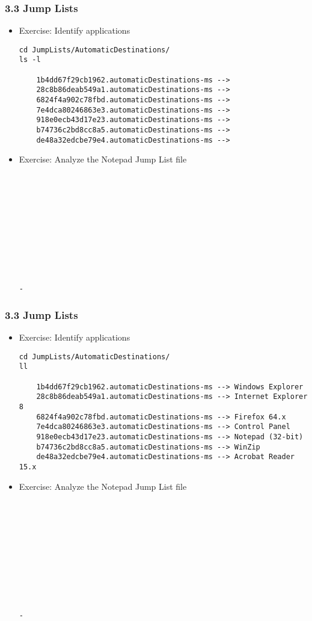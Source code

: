 \begin{frame}[fragile]
  \frametitle{3.3 Jump Lists}
    \begin{itemize}
        \item Exercise: Identify applications
  \begin{lstlisting}[basicstyle=\tiny]
cd JumpLists/AutomaticDestinations/
ls -l

    1b4dd67f29cb1962.automaticDestinations-ms --> 
    28c8b86deab549a1.automaticDestinations-ms --> 
    6824f4a902c78fbd.automaticDestinations-ms --> 
    7e4dca80246863e3.automaticDestinations-ms --> 
    918e0ecb43d17e23.automaticDestinations-ms --> 
    b74736c2bd8cc8a5.automaticDestinations-ms --> 
    de48a32edcbe79e4.automaticDestinations-ms --> 
  \end{lstlisting}
	\item Exercise: Analyze the Notepad Jump List file
  \begin{lstlisting}[basicstyle=\tiny]











-
  \end{lstlisting}
    \end{itemize}
\end{frame}


\begin{frame}[fragile]
  \frametitle{3.3 Jump Lists}
    \begin{itemize}
        \item Exercise: Identify applications
  \begin{lstlisting}[basicstyle=\tiny]
cd JumpLists/AutomaticDestinations/
ll

    1b4dd67f29cb1962.automaticDestinations-ms --> Windows Explorer
    28c8b86deab549a1.automaticDestinations-ms --> Internet Explorer 8
    6824f4a902c78fbd.automaticDestinations-ms --> Firefox 64.x
    7e4dca80246863e3.automaticDestinations-ms --> Control Panel
    918e0ecb43d17e23.automaticDestinations-ms --> Notepad (32-bit)
    b74736c2bd8cc8a5.automaticDestinations-ms --> WinZip
    de48a32edcbe79e4.automaticDestinations-ms --> Acrobat Reader 15.x
  \end{lstlisting}
	\item Exercise: Analyze the Notepad Jump List file
  \begin{lstlisting}[basicstyle=\tiny]











-
  \end{lstlisting}
    \end{itemize}
\end{frame}


